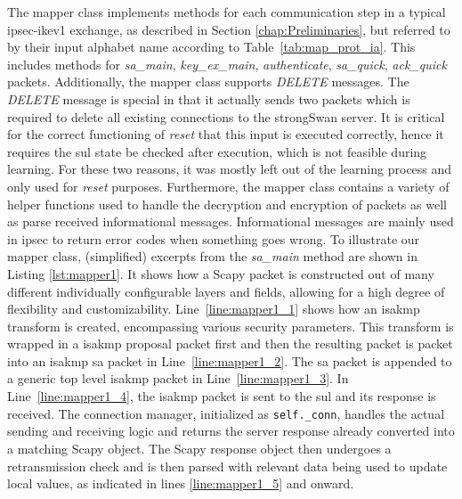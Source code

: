 The mapper class implements methods for each communication step in a typical \ac{ipsec}-\ac{ike}v1 exchange, as described in Section \ref{chap:Preliminaries}, but referred to by their input alphabet name according to Table~\ref{tab:map_prot_ia}. This includes methods for \emph{sa\_main}, \emph{key\_ex\_main}, \emph{authenticate}, \emph{sa\_quick}, \emph{ack\_quick} packets. Additionally, the mapper class supports \emph{DELETE} messages. The \emph{DELETE} message is special in that it actually sends two packets which is required to delete all existing connections to the strongSwan server. It is critical for the correct functioning of \emph{reset} that this input is executed correctly, hence it requires the \ac{sul} state be checked after execution, which is not feasible during learning. For these two reasons, it was mostly left out of the learning process and only used for \emph{reset} purposes. Furthermore, the mapper class contains a variety of helper functions used to handle the decryption and encryption of packets as well as parse received informational messages. Informational messages are mainly used in \ac{ipsec} to return error codes when something goes wrong. To illustrate our mapper class, (simplified) excerpts from the \emph{sa\_main} method are shown in Listing \ref{lst:mapper1}. It shows how a Scapy packet is constructed out of many different individually configurable layers and fields, allowing for a high degree of flexibility and customizability. Line~\ref{line:mapper1_1} shows how an \ac{isakmp} transform is created, encompassing various security parameters. This transform is wrapped in a \ac{isakmp} proposal packet first and then the resulting packet is packet into an \ac{isakmp} \ac{sa} packet in Line~\ref{line:mapper1_2}. The \ac{sa} packet is appended to a generic top level \ac{isakmp} packet in Line~\ref{line:mapper1_3}. In Line~\ref{line:mapper1_4}, the \ac{isakmp} packet is sent to the \ac{sul} and its response is received. The connection manager, initialized as \texttt{self.\_conn}, handles the actual sending and receiving logic and returns the server response already converted into a matching Scapy object. The Scapy response object then undergoes a retransmission check and is then parsed with relevant data being used to update local values, as indicated in lines \ref{line:mapper1_5} and onward. 
\newpage

